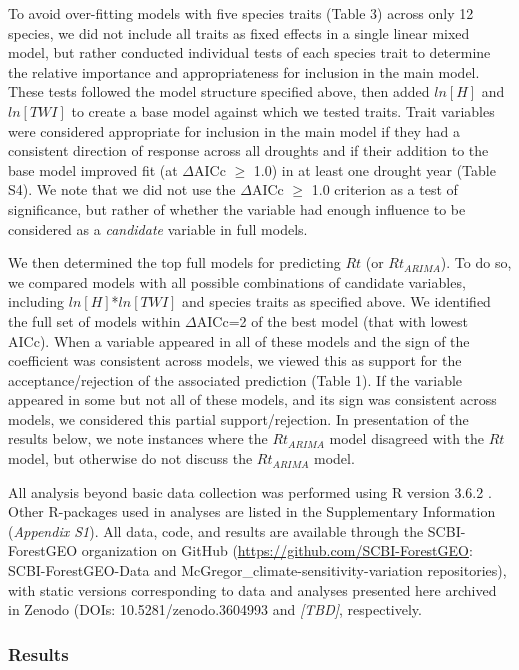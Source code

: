 \documentclass[
]{article}
\begin{document}
To avoid over-fitting models with five species traits (Table 3) across
only 12 species, we did not include all traits as fixed effects in a
single linear mixed model, but rather conducted individual tests of each
species trait to determine the relative importance and appropriateness
for inclusion in the main model. These tests followed the model
structure specified above, then added \(ln[H]\) and \(ln[TWI]\) to
create a base model against which we tested traits. Trait variables were
considered appropriate for inclusion in the main model if they had a
consistent direction of response across all droughts and if their
addition to the base model improved fit (at \(\Delta\)AICc \(\ge\) 1.0)
in at least one drought year (Table S4). We note that we did not use the
\(\Delta\)AICc \(\ge\) 1.0 criterion as a test of significance, but
rather of whether the variable had enough influence to be considered as
a \emph{candidate} variable in full models.

We then determined the top full models for predicting \(Rt\) (or
\(Rt_{ARIMA}\)). To do so, we compared models with all possible
combinations of candidate variables, including \(ln[H]\)*\(ln[TWI]\) and
species traits as specified above. We identified the full set of models
within \(\Delta\)AICc=2 of the best model (that with lowest AICc). When
a variable appeared in all of these models and the sign of the
coefficient was consistent across models, we viewed this as support for
the acceptance/rejection of the associated prediction (Table 1). If the
variable appeared in some but not all of these models, and its sign was
consistent across models, we considered this partial support/rejection.
In presentation of the results below, we note instances where the
\(Rt_{ARIMA}\) model disagreed with the \(Rt\) model, but otherwise do
not discuss the \(Rt_{ARIMA}\) model.

All analysis beyond basic data collection was performed using R version
3.6.2 \citep{R-base}. Other R-packages used in analyses are listed in
the Supplementary Information (\emph{Appendix S1}). All data, code, and
results are available through the SCBI-ForestGEO organization on GitHub
(\url{https://github.com/SCBI-ForestGEO}: SCBI-ForestGEO-Data and
McGregor\_climate-sensitivity-variation repositories), with static
versions corresponding to data and analyses presented here archived in
Zenodo (DOIs: 10.5281/zenodo.3604993 and \emph{{[}TBD{]}}, respectively.

\hypertarget{results}{%
\subsubsection{Results}\label{results}}
\end{document}
